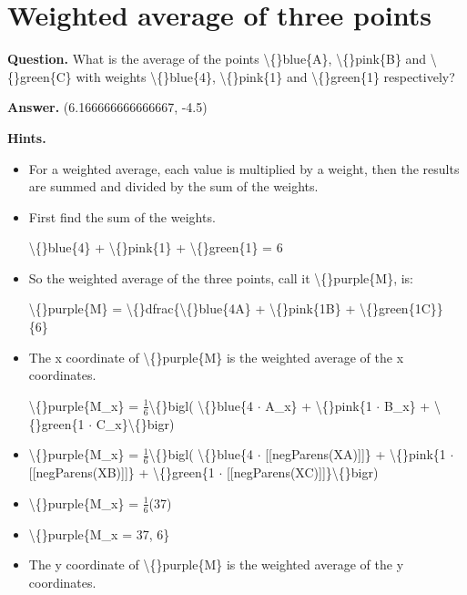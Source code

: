 \documentclass{article}
\begin{document}
\section*{Weighted average of three points}
\textbf{Question.} What is the average of the points \textbackslash\{\}blue\{A\}, \textbackslash\{\}pink\{B\} and \textbackslash\{\}green\{C\} with weights
                    \textbackslash\{\}blue\{4\}, \textbackslash\{\}pink\{1\} and \textbackslash\{\}green\{1\} respectively?

\textbf{Answer.} (6.166666666666667, -4.5)

\textbf{Hints.}
\begin{itemize}
  \item For a weighted average, each value is multiplied by a weight, then the results are summed and divided by the sum of the weights.
  \item First find the sum of the weights.
                        
                            \textbackslash\{\}blue\{4\} + \textbackslash\{\}pink\{1\} + \textbackslash\{\}green\{1\} = 6
  \item So the weighted average of the three points, call it \textbackslash\{\}purple\{M\}, is:
                        
                            \textbackslash\{\}purple\{M\} = \textbackslash\{\}dfrac\{\textbackslash\{\}blue\{4A\} + \textbackslash\{\}pink\{1B\} + \textbackslash\{\}green\{1C\}\}
                            \{6\}
  \item The x coordinate of \textbackslash\{\}purple\{M\} is the weighted average of the x coordinates.
                        
                            \textbackslash\{\}purple\{M\_x\} = $\frac{1}{6}$\textbackslash\{\}bigl(
                            \textbackslash\{\}blue\{4 $\cdot$ A\_x\} + 
                            \textbackslash\{\}pink\{1 $\cdot$ B\_x\} + 
                            \textbackslash\{\}green\{1 $\cdot$ C\_x\}\textbackslash\{\}bigr)
  \item \textbackslash\{\}purple\{M\_x\} = $\frac{1}{6}$\textbackslash\{\}bigl(
                        \textbackslash\{\}blue\{4 $\cdot$ [[negParens(XA)]]\} + 
                        \textbackslash\{\}pink\{1 $\cdot$ [[negParens(XB)]]\} + 
                        \textbackslash\{\}green\{1 $\cdot$ [[negParens(XC)]]\}\textbackslash\{\}bigr)
  \item \textbackslash\{\}purple\{M\_x\} = $\frac{1}{6}$(37)
  \item \textbackslash\{\}purple\{M\_x = 37, 6\}
  \item The y coordinate of \textbackslash\{\}purple\{M\} is the weighted average of the y coordinates.
                        

\end{itemize}
\end{document}
